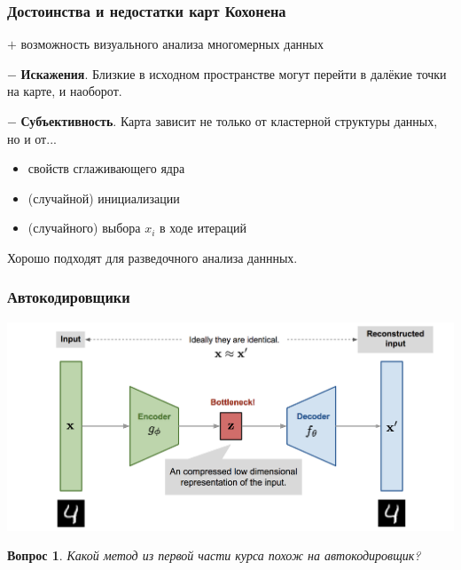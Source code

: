 \documentclass[fullscreen=true, bookmarks=true, hyperref={pdfencoding=unicode}]{beamer}
\newtheorem*{question}{Вопрос}
\begin{document}
\begin{frame}[t]
  \frametitle{Достоинства и недостатки карт Кохонена}

   $+$ возможность визуального анализа многомерных данных

   $-$ {\bf Искажения}. Близкие в исходном пространстве могут перейти в далёкие точки на карте, и наоборот.

   $-$ {\bf Субъективность}. Карта зависит не только от кластерной структуры данных, но и от...

   \begin{itemize}
     \item свойств сглаживающего ядра
     \item (случайной) инициализации
     \item (случайного) выбора $x_i$ в ходе итераций
   \end{itemize}

   \vspace{1cm}
   Хорошо подходят для разведочного анализа даннных.
 \end{frame}


\begin{frame}
  \frametitle{Автокодировщики}

  \begin{center}
    \includegraphics[keepaspectratio,
                     width=0.8\paperwidth]{autoencoder-architecture.png}
  \end{center}
  \pause
  \begin{question}
    Какой метод из первой части курса похож на автокодировщик?
  \end{question}
\end{frame}
\end{document}
